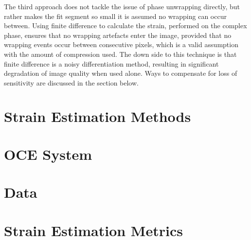 The third approach does not tackle the issue of phase unwrapping directly, but rather makes the fit segment so small it is assumed no wrapping can occur between. Using finite difference to calculate the strain, performed on the complex phase, ensures that no wrapping artefacts enter the image, provided that no wrapping events occur between consecutive pixels, which is a valid assumption with the amount of compression used. The down side to this technique is that finite difference is a noisy differentiation method, resulting in significant degradation of image quality when used alone. Ways to compensate for loss of sensitivity are discussed in the section below.

\section{Strain Estimation Methods}

\section{OCE System}

\section{Data}

\section{Strain Estimation Metrics}
